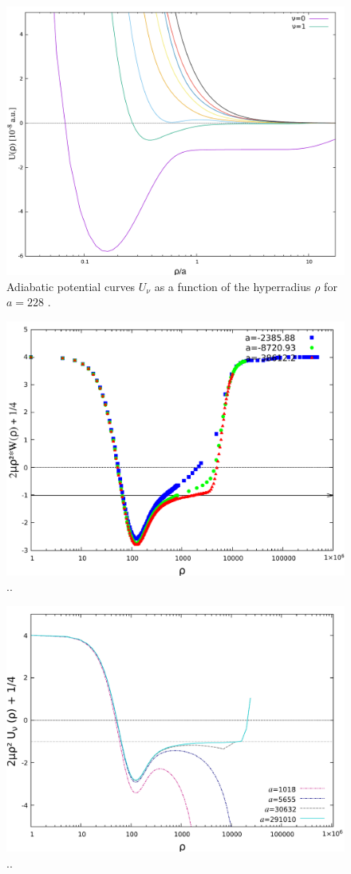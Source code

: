 \begin{figure}
	\includegraphics[width=\linewidth]{adiabatic.pdf}
	\caption{Adiabatic potential curves $U_{\nu}$ as a function of the hyperradius $\rho$ for $a=228 $ .}
	\label{fig:3}
\end{figure}

\begin{figure}
	\includegraphics[width=\linewidth]{negativ_a.pdf}
	\caption{..}
	\label{fig:5}
\end{figure}

\begin{figure}
	\includegraphics[width=\linewidth]{positive_a.pdf}
	\caption{..}
	\label{fig:6}
\end{figure}